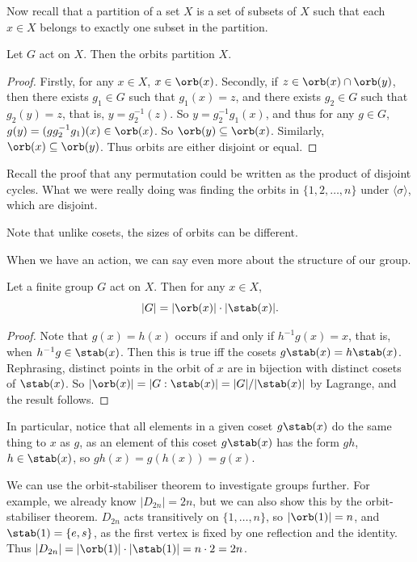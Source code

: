 \documentclass[a4paper]{scrartcl}
\begin{document}
Now recall that a partition of a set $X$ is a set of subsets of $X$ such that each $x \in X$ belongs to exactly one subset in the partition.

\begin{lemma}
	Let $G$ act on $X$. Then the orbits partition $X$.
\end{lemma}
\begin{proof}
	Firstly, for any $x \in X$, $x \in \orb(x)$. Secondly, if $z \in \orb(x) \cap \orb(y)$, then there exists $g_1 \in G$ such that $g_1(x) = z$, and there exists $g_2 \in G$ such that $g_2 (y) = z$, that is, $y = g_2^{-1}(z)$. So $y = g_2^{-1} g_1 (x)$, and thus for any $g \in G$, $g(y) = (g g_2^{-1} g_1)(x) \in \orb(x)$. So $\orb(y) \subseteq \orb(x)$. Similarly, $\orb(x) \subseteq \orb(y)$. Thus orbits are either disjoint or equal.
\end{proof}

Recall the proof that any permutation could be written as the product of disjoint cycles. What we were really doing was finding the orbits in $\{1, 2, \dots, n\}$ under $\langle \sigma \rangle$, which are disjoint.

\begin{remark}
	Note that unlike cosets, the sizes of orbits can be different.
\end{remark}

When we have an action, we can say even more about the structure of our group.

\begin{theorem}
	Let a finite group $G$ act on $X$. Then for any $x \in X$,
	$$
	|G| = |\orb(x)| \cdot |\stab(x)|.
	$$
\end{theorem}
\begin{proof}
	Note that $g(x) = h(x)$ occurs if and only if $h^{-1} g (x) = x$, that is, when $h^{-1} g \in \stab(x)$. Then this is true iff the cosets $g \stab(x) = h\stab(x)$. Rephrasing, distinct points in the orbit of $x$ are in bijection with distinct cosets of $\stab(x)$. So $|\orb(x)| = |G : \stab(x)| = |G| / |\stab(x) |$ by Lagrange, and the result follows.
\end{proof}

In particular, notice that all elements in a given coset $g \stab(x)$ do the same thing to $x$ as $g$, as an element of this coset $g\stab(x)$ has the form $gh$, $h \in \stab(x)$, so $gh(x) = g(h(x)) = g(x)$.

We can use the orbit-stabiliser theorem to investigate groups further. For example, we already know $|D_{2n}| = 2n$, but we can also show this by the orbit-stabiliser theorem. $D_{2n}$ acts transitively on $\{1, \dots, n\}$, so $|\orb(1)| = n$, and $\stab(1) = \{e, s\}$, as the first vertex is fixed by one reflection and the identity. Thus $|D_{2n}| = |\orb(1)| \cdot |\stab(1)| = n \cdot 2 = 2n$.
\end{document}
